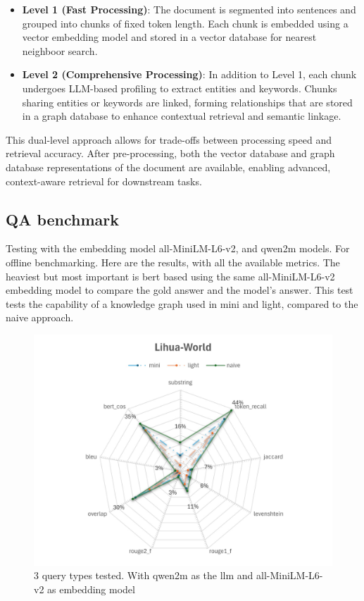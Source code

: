 \begin{itemize}
\item \textbf{Level 1 (Fast Processing)}: The document is segmented into sentences and grouped into chunks of fixed token length. Each chunk is embedded using a vector embedding model and stored in a vector database for nearest neighboor search.
\item \textbf{Level 2 (Comprehensive Processing)}: In addition to Level 1, each chunk undergoes LLM-based profiling to extract entities and keywords. Chunks sharing entities or keywords are linked, forming relationships that are stored in a graph database to enhance contextual retrieval and semantic linkage.
\end{itemize}

This dual-level approach allows for trade-offs between processing speed and retrieval accuracy. After pre-processing, both the vector database and graph database representations of the document are available, enabling advanced, context-aware retrieval for downstream tasks.

\subsection{QA benchmark}
Testing with the embedding model all-MiniLM-L6-v2, and qwen2m models. For offline benchmarking. Here are the results, with all the available metrics. The heaviest but most important is bert based using the same all-MiniLM-L6-v2 embedding model to compare the gold answer and the model's answer. This test tests the capability of a knowledge graph used in mini and light, compared to the naive approach.

\begin{figure}[H]
    \centering
    \includegraphics[width=1\linewidth]{Figures/Lihua-World.jpg}
    \caption{3 query types tested. With qwen2m as the llm and all-MiniLM-L6-v2 as embedding model}
    \label{fig:Lihua-World}
\end{figure}

